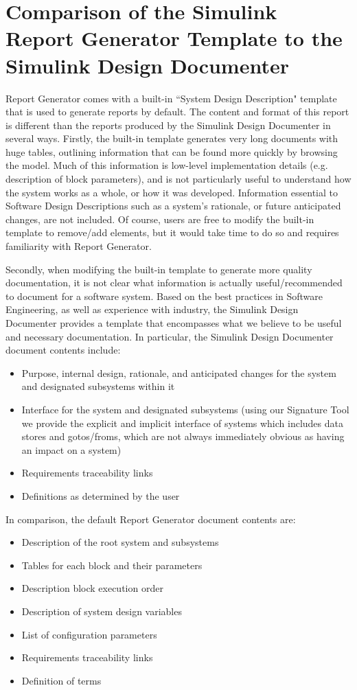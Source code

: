 \documentclass{mcscert}
\newcommand{\rptgen}{\simulink{} Report Generator}
\newcommand{\sigtool}{Signature Tool}
\newcommand{\sddtool}{Simulink Design Documenter}
\begin{document}
\section{Comparison of the Simulink Report Generator Template to the \sddtool{}}
\rptgen{} comes with a built-in ``System Design Description" template that is 
used to generate reports by default. 
The content and format of this report is different than the reports produced by 
the \sddtool{} in several ways. 
Firstly, the built-in template generates very long documents with huge tables, 
outlining information that can be found more quickly by browsing the model. 
Much of this information is low-level implementation details 
(e.g. description of block parameters), 
and is not particularly useful to understand how the system works as a whole, or
how it was developed. 
Information essential to Software Design Descriptions such as a system's 
rationale, or future anticipated changes, are not included. 
Of course, users are free to modify the built-in template to remove/add 
elements, but it would take time to do so and requires familiarity with \rptgen{}. 

Secondly, when modifying the built-in template to generate more quality 
documentation, it is not clear what information is actually useful/recommended 
to document for a software system. 
Based on the best practices in Software Engineering, as well as experience with 
industry, the \sddtool{} provides a template that encompasses what we believe to
be useful and necessary documentation. 
In particular, the \sddtool{} document contents include:

\begin{itemize}
	\item Purpose, internal design, rationale, and anticipated changes for the system and designated subsystems within it 
	\item Interface for the system and designated subsystems (using our \sigtool{} we provide the explicit and implicit interface of systems which includes data stores and gotos/froms, which are not always immediately obvious as having an impact on a system)
	\item Requirements traceability links
	\item Definitions as determined by the user
\end{itemize}

\noindent In comparison, the default \rptgen{} document contents are:
\begin{itemize}
	\item Description of the root system and subsystems
	\item Tables for each block and their parameters
	\item Description block execution order
	\item Description of system design variables
	\item List of configuration parameters
	\item Requirements traceability links
	\item Definition of \simulink{} terms
\end{itemize}
\end{document}
